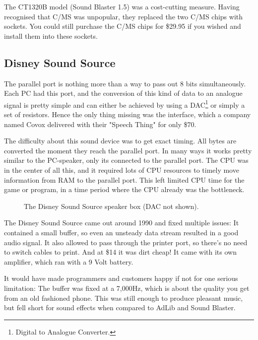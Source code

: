 \documentclass[book.tex]{subfiles}
\begin{document}
\par
   The CT1320B model (Sound Blaster 1.5) was a cost-cutting measure. Having recognised that C/MS was unpopular, they replaced the two C/MS chips with sockets. You could still purchase the C/MS chips for \$29.95 if you wished and install them into these sockets.\\


  \subsection{Disney Sound Source}
  The parallel port is nothing more than a way to pass out 8 bits simultaneously. Each PC had this port, and the conversion of this kind of data to an analogue signal is pretty simple and can either be achieved by using a DAC\footnote{Digital to Analogue Converter.} or simply a set of resistors. Hence the only thing missing was the interface, which a company named Covox delivered with their "Speech Thing" for only \$70.\\

\par  
   The difficulty about this sound device was to get exact timing. All bytes are converted the moment they reach the parallel port. In many ways it works pretty similar to the PC-speaker, only its connected to the parallel port. The CPU was in the center of all this, and it required lots of CPU resources to timely move information from RAM to the parallel port.  This left limited CPU time for the game or program, in a time period where the CPU already was the bottleneck.\\
   
  \par
  \begin{figure}[H] 
    \centering 
    \caption{The Disney Sound Source speaker box (DAC not shown).}
  \end{figure}
\par   
   
   \par
The Disney Sound Source came out around 1990 and fixed multiple issues: It contained a small buffer, so even an unsteady data stream resulted in a good audio signal. It also allowed to pass through the printer port, so there's no need to switch cables to print. And at \$14 it was dirt cheap! It came with its own amplifier, which ran with a 9 Volt battery. 


It would have made programmers and customers happy if not for one serious limitation: The buffer was fixed at a 7,000Hz, which is about the quality you get from an old fashioned phone. This was still enough to produce pleasant music, but fell short for sound effects when compared to AdLib and Sound Blaster.
\end{document}
